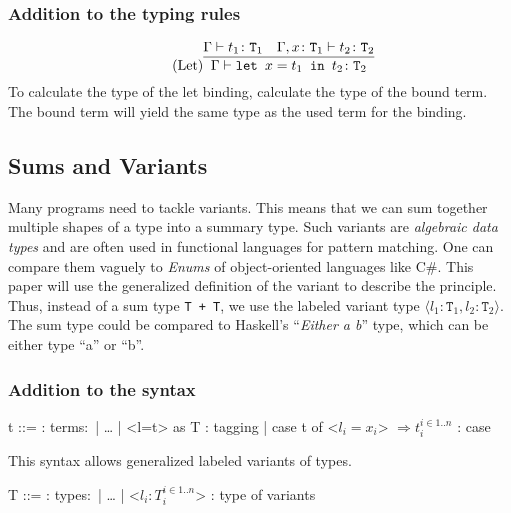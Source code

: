 \subsubsection{Addition to the typing rules \cite{pierce2002ProgLang}}
\begin{equation*}
    \tag{Let}
    \infer{
        \Gamma \vdash \texttt{let } x=t_1 \texttt{ in } t_2 \colon \texttt{T}_2
    }{
        \Gamma \vdash t_1 \colon \texttt{T}_1 & \Gamma , x \colon \texttt{T}_1 \vdash t_2 \colon \texttt{T}_2
    }
\end{equation*}
To calculate the type of the let binding, calculate the type of the bound term. The bound
term will yield the same type as the used term for the binding.

\subsection{Sums and Variants}
\label{subsec:variants}

Many programs need to tackle variants. This means
that we can sum together multiple shapes of a type into a summary
type. Such variants are \textit{algebraic data types} and are often used in functional
languages for pattern matching. One can compare them vaguely to \textit{Enums} of
object-oriented languages like C\#.
This paper will use the generalized definition
of the variant to describe the principle. Thus, instead of a sum type \texttt{T + T},
we use the labeled variant type $\langle l_1 \colon \texttt{T}_1, l_2 \colon \texttt{T}_2 \rangle$.
The sum type could be compared to Haskell's ``\textit{Either a b}'' type, which can be
either type ``a'' or ``b''.

\subsubsection{Addition to the syntax \cite{pierce2002ProgLang}}
\begin{bnfgrammar}
    t ::= : terms$\colon$
    | \dots
    | <l=t> as T : tagging
    | case t of <$l_i=x_i$> $\Rightarrow t_i^{i \in 1..n}$ : case
\end{bnfgrammar}\leavevmode\newline
This syntax allows generalized labeled variants of types.

\begin{bnfgrammar}
    T ::= : types$\colon$
    | \dots
    | <$l_i \colon T_i^{i \in 1..n}$> : type of variants
\end{bnfgrammar}\leavevmode\newline

